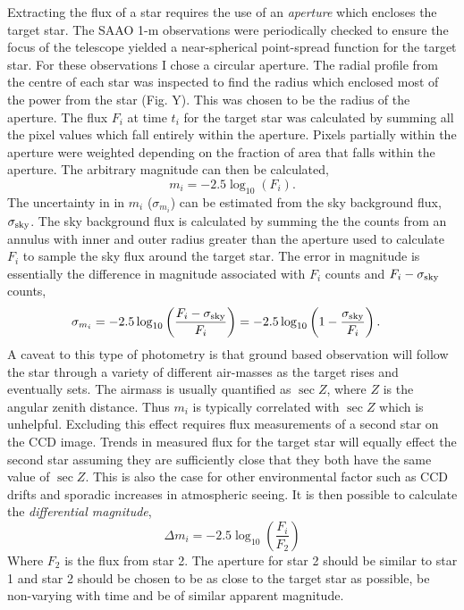 Extracting the flux of a star requires the use of an \textit{aperture} which encloses the target star. The SAAO 1-m observations were periodically checked to ensure the focus of the telescope yielded a near-spherical point-spread function for the target star. For these observations I chose a circular aperture. The radial profile from the centre of each star was inspected to find the radius which enclosed most of the power from the star (Fig. Y). This was chosen to be the radius of the aperture. The flux $F_i$ at time $t_i$ for the target star was calculated by summing all the pixel values which fall entirely within the aperture. Pixels partially within the aperture were weighted depending on the fraction of area that falls within the aperture. The arbitrary magnitude can then be calculated,
\begin{equation}
m_i = -2.5 \log_{10} (F_i) .
\end{equation}
The uncertainty in in $m_i$ ($\sigma_{m_i}$) can be estimated from the sky background flux, $\sigma_{\rm sky}$.  The sky background flux is calculated by summing the the counts  from an annulus with inner and outer radius greater than the aperture used to calculate $F_i$ to sample the sky flux around the target star.  The error in magnitude is essentially the difference in magnitude associated with $F_i$ counts and $F_i  - \sigma_{\rm sky}$ counts,
\begin{eqnarray}
\sigma_{m_i} &= -2.5 \log_{10} \left( \frac{F_i - \sigma_{\rm sky}}{F_i} \right) = -2.5 \log_{10} \left(1 -  \frac{\sigma_{\rm sky}}{F_i} \right) .
\end{eqnarray}A caveat to this type of photometry  is that ground based observation will follow the star through a variety of different air-masses as the target rises and eventually sets. The airmass is usually quantified as $\sec Z$, where $Z$  is the angular zenith distance. Thus $m_i$ is typically correlated with $\sec Z$ which is unhelpful. Excluding this effect requires flux measurements of a second star on the CCD image. Trends in measured flux for the target star will equally effect the second star assuming they are sufficiently close  that they both have the same value of $\sec Z$. This is also the case for other environmental factor such as CCD drifts and sporadic increases in atmospheric seeing. It is then possible to calculate the \textit{differential magnitude},
\begin{equation}
\Delta m_i = -2.5 \log_{10} \left( \frac{F_i}{F_2} \right)
\end{equation}
Where $F_2$ is the flux from star 2. The aperture for star 2 should be similar to star 1 and star 2 should be chosen to be as close to the target star as possible, be non-varying with time and be of similar apparent magnitude.

